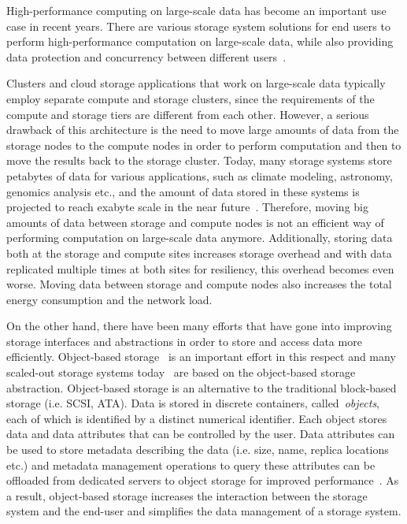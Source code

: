 High-performance computing on large-scale data has become an
important use case in recent years. There are various storage
system solutions for end users to perform high-performance
computation on large-scale data, while also providing data
protection and concurrency between different users~\cite{amazon_ec2}.

Clusters and cloud storage applications that work on large-scale
data typically employ separate compute and storage clusters, since
the requirements of the compute and storage tiers are different
from each other. However, a serious drawback of this architecture
is the need to move large amounts of data from the storage nodes to the 
compute nodes in order to perform computation and then to move
the results back to the storage cluster. Today, many storage
systems store petabytes of data for various applications, such as
climate modeling, astronomy, genomics analysis etc., and the amount
of data stored in these systems is projected to reach exabyte scale in
the near
future~\cite{idcbigdata}. Therefore, moving big amounts of data
between storage and compute nodes is not an efficient way of performing
computation on large-scale data anymore. Additionally, storing data
both at the storage and compute sites increases storage overhead
and with data replicated multiple times at both sites for resiliency,
this overhead becomes even worse. Moving data between storage and
compute nodes also increases the total energy consumption and the
network load.

On the other hand, there have been many efforts that have gone into
improving storage interfaces and abstractions in order to store
and access data more efficiently. Object-based
storage~\cite{Gibson:1998:CHS:291006.291029, 1222722} is
an important effort in this respect and many scaled-out storage
systems today~\cite{lustre_web,maltzahn2010ceph,openstack_swift}
are based on the object-based storage abstraction.
Object-based storage is an alternative to the traditional block-based
storage (i.e. SCSI, ATA). Data is stored in discrete
containers, called~\textit{objects}, each of which is identified
by a distinct numerical identifier. Each object stores data and data
attributes that can be controlled by the user. Data attributes can be used
to store metadata describing the data (i.e. size, name, replica
locations etc.) and metadata management operations to query these
attributes can be offloaded from dedicated servers to object storage
for improved performance~\cite{revisitmd}. As a result, object-based
storage increases the interaction between the storage system and
the end-user and simplifies the data management of a storage
system.

